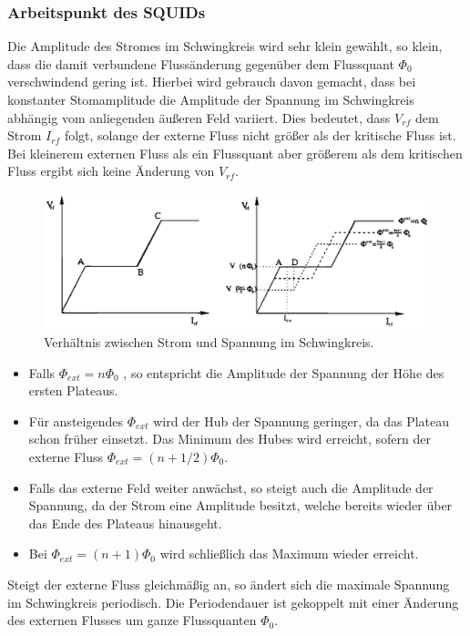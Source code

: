 \documentclass[12pt]{article}
\begin{document}
\subsubsection{Arbeitspunkt des SQUIDs}
Die Amplitude des Stromes im Schwingkreis wird sehr klein gewählt, so klein, dass die damit verbundene Flussänderung gegenüber dem Flussquant 
$\Phi_0$ verschwindend gering ist. Hierbei wird gebrauch davon gemacht, dass bei konstanter Stomamplitude die Amplitude der Spannung im Schwingkreis abhängig vom anliegenden äußeren Feld variiert. Dies bedeutet, dass $V_{rf}$ dem Strom $I_{rf}$ folgt, solange der externe Fluss
nicht größer als der kritische Fluss ist. Bei kleinerem externen Fluss als ein Flussquant aber größerem
als dem kritischen Fluss ergibt sich keine Änderung von $V_{rf}$. 
\begin{figure}[H]
\centering
\includegraphics[width=0.9\linewidth]{pictures/squid_strom_verlauf.eps}
\caption{Verhältnis zwischen Strom und Spannung im Schwingkreis.}
\end{figure}

\begin{itemize}
 \item Falls $\Phi_{ext} = n \Phi_0$ , so entspricht die Amplitude der Spannung der Höhe des ersten Plateaus.
 \item Für ansteigendes $\Phi_{ext}$ wird der Hub der Spannung geringer, da das Plateau schon früher einsetzt.
       Das Minimum des Hubes wird erreicht, sofern der externe Fluss $\Phi_{ext} = (n + 1/2) \Phi_0$.
 \item Falls das externe Feld weiter anwächst, so steigt auch die Amplitude der Spannung, da der Strom eine Amplitude besitzt, welche bereits
       wieder über das Ende des Plateaus hinausgeht.
 \item Bei $\Phi_{ext} = (n + 1) \Phi_0$ wird schließlich das Maximum wieder erreicht.
\end{itemize}

Steigt der externe Fluss gleichmäßig an, so ändert sich die maximale Spannung im Schwingkreis periodisch. Die Periodendauer ist gekoppelt mit einer Änderung des externen Flusses um ganze Flussquanten $\Phi_0$.
\end{document}
